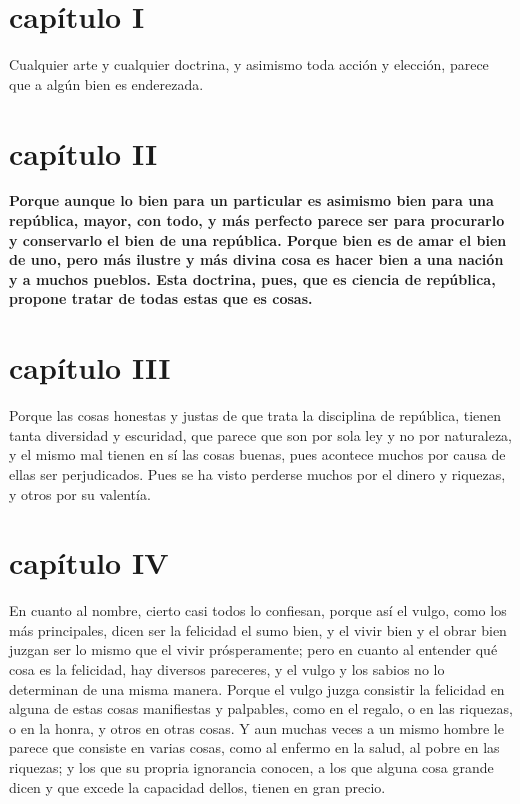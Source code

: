 \begin{multicols}{2}

\section*{capítulo I}
Cualquier arte y cualquier doctrina, y asimismo toda acción y elección, parece que a algún bien es enderezada.

\section*{capítulo II}
\textbf{Porque aunque lo bien para un particular es asimismo bien para una república, mayor, con todo, y más perfecto parece ser para procurarlo y conservarlo el bien de una república. Porque bien es de amar el bien de uno, pero más ilustre y más divina cosa es hacer bien a una nación y a muchos pueblos. Esta doctrina, pues, que es ciencia de república, propone tratar de todas estas que es cosas.}\\

\section*{capítulo III}
Porque las cosas honestas y justas de que trata la disciplina de república, tienen tanta diversidad y escuridad, que parece que son por sola ley y no por naturaleza, y el mismo mal tienen en sí las cosas buenas, pues acontece muchos por causa de ellas ser perjudicados. Pues se ha visto perderse muchos por el dinero y riquezas, y otros por su valentía.

\section*{capítulo IV}
En cuanto al nombre, cierto casi todos lo confiesan, porque así el vulgo, como los más principales, dicen ser la felicidad el sumo bien, y el vivir bien y el obrar bien juzgan ser lo mismo que el vivir prósperamente; pero en cuanto al entender qué cosa es la felicidad, hay diversos pareceres, y el vulgo y los sabios no lo determinan de una misma manera. Porque el vulgo juzga consistir la felicidad en alguna de estas cosas manifiestas y palpables, como en el regalo, o en las riquezas, o en la honra, y otros en otras cosas. Y aun muchas veces a un mismo hombre le parece que consiste en varias cosas, como al enfermo en la salud, al pobre en las riquezas; y los que su propria ignorancia conocen, a los que alguna cosa grande dicen y que excede la capacidad dellos, tienen en gran precio.


\end{multicols}
